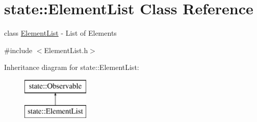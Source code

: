 \hypertarget{classstate_1_1_element_list}{}\section{state\+:\+:Element\+List Class Reference}
\label{classstate_1_1_element_list}


class \hyperlink{classstate_1_1_element_list}{Element\+List} -\/ List of Elements  




{\ttfamily \#include $<$Element\+List.\+h$>$}

Inheritance diagram for state\+:\+:Element\+List\+:\begin{figure}[H]
\begin{center}
\leavevmode
\includegraphics[height=2.000000cm]{classstate_1_1_element_list}
\end{center}
\end{figure}
